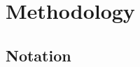 \documentclass[conference,compsoc]{IEEEtran}
\begin{document}
%





\section{Methodology}

\subsection{Notation}
\end{document}
